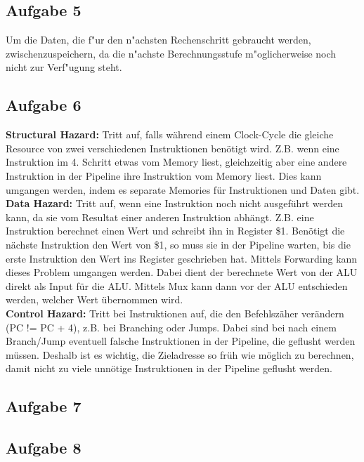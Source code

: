 \documentclass[a4paper,abstracton]{scrartcl}
\begin{document}
\subsection{Aufgabe 5}
Um die Daten, die f"ur den n"achsten Rechenschritt gebraucht werden, zwischenzuspeichern, da die 
n"achste Berechnungsstufe m"oglicherweise noch nicht zur Verf"ugung steht.
\subsection{Aufgabe 6}
\textbf{Structural Hazard:} Tritt auf, falls während einem Clock-Cycle die gleiche Resource von zwei verschiedenen Instruktionen benötigt wird. Z.B. wenn eine Instruktion im 4. Schritt etwas vom Memory liest, gleichzeitig aber eine andere Instruktion in der Pipeline ihre Instruktion vom Memory liest. Dies kann umgangen werden, indem es separate Memories für Instruktionen und Daten gibt.\\
\textbf{Data Hazard:} Tritt auf, wenn eine Instruktion noch nicht ausgeführt werden kann, da sie vom Resultat einer anderen Instruktion abhängt. Z.B. eine Instruktion berechnet einen Wert und schreibt ihn in Register \$1. Benötigt die nächste Instruktion den Wert von \$1, so muss sie in der Pipeline warten, bis die erste Instruktion den Wert ins Register geschrieben hat. Mittels Forwarding kann dieses Problem umgangen werden. Dabei dient der berechnete Wert von der ALU direkt als Input für die ALU. Mittels Mux kann dann vor der ALU entschieden werden, welcher Wert übernommen wird. \\
\textbf{Control Hazard:} Tritt bei Instruktionen auf, die den Befehlszäher verändern (PC != PC + 4), z.B. bei Branching oder Jumps. Dabei sind bei nach einem Branch/Jump eventuell falsche Instruktionen in der Pipeline, die geflusht werden müssen. Deshalb ist es wichtig, die Zieladresse so früh wie möglich zu berechnen, damit nicht zu viele unnötige Instruktionen in der Pipeline geflusht werden.\\
\subsection{Aufgabe 7}

\subsection{Aufgabe 8}
\begin{lstlisting}

\end{lstlisting}
\end{document}
